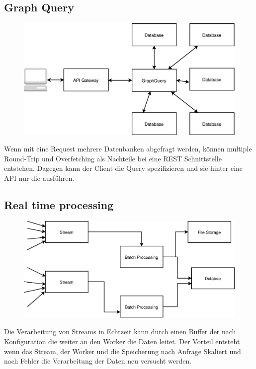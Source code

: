 \documentclass[
12pt,
english,
ngerman,
headsepline,
twoside,
openright,
numbers=noenddot,version=first
]{scrreprt}
\begin{document}
\subsection{Graph Query}
\begin{figure}
	\includegraphics[scale=0.36]{./pics/GraphQuery.eps}
\end{figure}
Wenn mit eine Request mehrere Datenbanken abgefragt werden, können multiple Round-Trip und Overfetching als Nachteile bei eine \acrshort{REST} Schnittstelle entstehen. Dagegen kann der Client die Query spezifizieren und sie hinter eine \acrshort{API} nur die ausführen. 


\subsection{Real time processing}
\begin{figure}
	\includegraphics[scale=0.36]{./pics/real-time-processing.eps}
\end{figure}
Die Verarbeitung von Streams in Echtzeit kann durch einen Buffer der nach Konfiguration die weiter an den Worker die Daten leitet. Der Vorteil entsteht wenn das Stream, der Worker und die Speicherung nach Anfrage Skaliert und nach Fehler die Verarbeitung der Daten neu versucht werden. 
\end{document}
